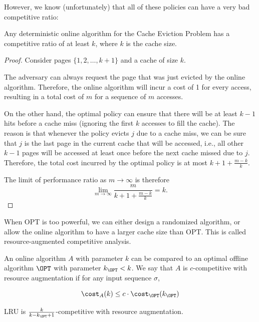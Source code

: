 However, we know (unfortunately) that all of these policies can have a very bad competitive ratio:

\begin{theorem}
  Any deterministic online algorithm for the Cache Eviction Problem has a competitive ratio of at least $k$, where $k$ is the cache size.
\end{theorem}

\begin{proof}
  Consider pages $\{1,2,\ldots,k+1\}$ and a cache of size $k$. 

  The adversary can always request the page that was just evicted by the online algorithm. Therefore, the online algorithm will incur a cost of 1 for every access, resulting in a total cost of $m$ for a sequence of $m$ accesses.

  On the other hand, the optimal policy can ensure that there will be at least $k-1$ hits before a cache miss (ignoring the first $k$ accesses to fill the cache). The reason is that whenever the policy evicts $j$ due to a cache miss, we can be sure that $j$ is the last page in the current cache that will be accessed, i.e., all other $k-1$ pages will be accessed at least once before the next cache missed due to $j$. Therefore, the total cost incurred by the optimal policy is at most $k+1+\frac{m-k}{k}$.

  The limit of performance ratio as $m \to \infty$ is therefore
  \[ \lim_{m \to \infty} \frac{m}{k+1+\frac{m-k}{k}} = k. \]
\end{proof}

When OPT is too powerful, we can either design a randomized algorithm, or allow the online algorithm to have a larger cache size than OPT. This is called resource-augmented competitive analysis.

\begin{definition}
  An online algorithm $A$ with parameter $k$ can be compared to an optimal offline algorithm $\OPT$ with parameter $k_{\OPT} < k$. We say that $A$ is $c$-competitive with resource augmentation if for any input sequence $\sigma$,

  \[ \cost_A(k) \leq c \cdot \cost_{\OPT}(k_{\OPT}) \]
\end{definition}

\begin{theorem}
  LRU is $\frac{k}{k - k_{\OPT} + 1}$-competitive with resource augmentation.
\end{theorem}

